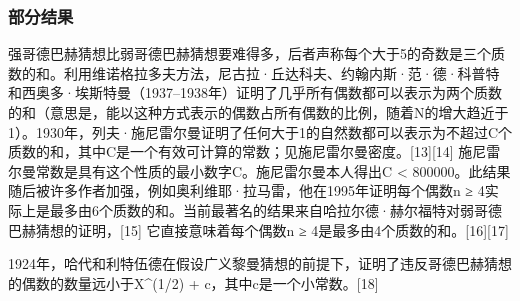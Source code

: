 \subsubsection{部分结果}  
强哥德巴赫猜想比弱哥德巴赫猜想要难得多，后者声称每个大于5的奇数是三个质数的和。利用维诺格拉多夫方法，尼古拉·丘达科夫、约翰内斯·范·德·科普特和西奥多·埃斯特曼（1937–1938年）证明了几乎所有偶数都可以表示为两个质数的和（意思是，能以这种方式表示的偶数占所有偶数的比例，随着N的增大趋近于1）。1930年，列夫·施尼雷尔曼证明了任何大于1的自然数都可以表示为不超过C个质数的和，其中C是一个有效可计算的常数；见施尼雷尔曼密度。[13][14] 施尼雷尔曼常数是具有这个性质的最小数字C。施尼雷尔曼本人得出C < 800000。此结果随后被许多作者加强，例如奥利维耶·拉马雷，他在1995年证明每个偶数n ≥ 4实际上是最多由6个质数的和。当前最著名的结果来自哈拉尔德·赫尔福特对弱哥德巴赫猜想的证明，[15] 它直接意味着每个偶数n ≥ 4是最多由4个质数的和。[16][17]

1924年，哈代和利特伍德在假设广义黎曼猜想的前提下，证明了违反哥德巴赫猜想的偶数的数量远小于X^(1/2) + c，其中c是一个小常数。[18]